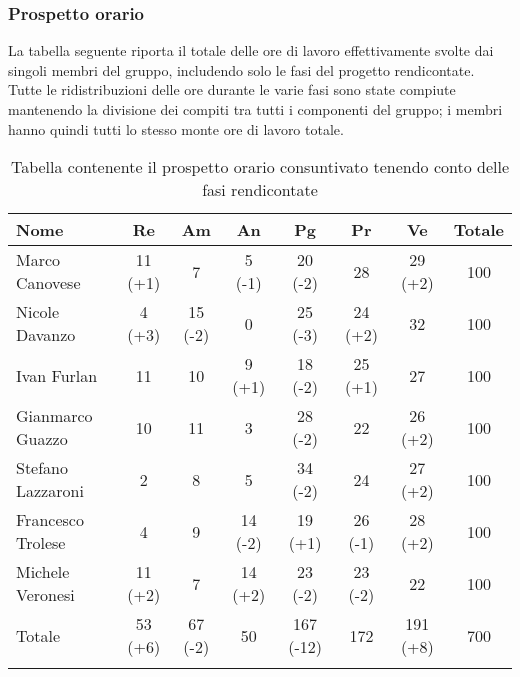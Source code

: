 \subsubsection{Prospetto orario}
La tabella seguente riporta il totale delle ore di lavoro effettivamente svolte dai singoli membri del gruppo, includendo solo le fasi del progetto rendicontate. Tutte le ridistribuzioni delle ore durante le varie fasi sono state compiute mantenendo la divisione dei compiti tra tutti i componenti del gruppo; i membri hanno quindi tutti lo stesso monte ore di lavoro totale.

\begin{longtable}{|p{1.5cm}|c|c|c|c|c|c|c|}
	\hline
	\rowcolor{lighter-grayer}
	\textbf{Nome}     & \textbf{Re} & \textbf{Am} & \textbf{An} & \textbf{Pg} & \textbf{Pr} & \textbf{Ve} & \textbf{Totale} \\
	\hline
	\endfirsthead

	\hline
	Marco Canovese    & 11 (+1)         & 7           & 5 (-1)          & 20 (-2)         & 28          & 29 (+2)         & 100             \\
	\hline
	\hline
	Nicole Davanzo    & 4 (+3)          & 15 (-2)         & 0           & 25 (-3)          & 24 (+2)         & 32          & 100             \\
	\hline
	\hline
	Ivan Furlan       & 11          & 10          & 9 (+1)          & 18 (-2)         & 25 (+1)         & 27          & 100             \\
	\hline
	\hline
	Gianmarco Guazzo  & 10          & 11          & 3           & 28 (-2)         & 22          & 26 (+2)         & 100             \\
	\hline
	\hline
	Stefano Lazzaroni & 2           & 8           & 5           & 34 (-2)         & 24          & 27 (+2)         & 100             \\
	\hline
	\hline
	Francesco Trolese & 4           & 9           & 14 (-2)         & 19 (+1)         & 26 (-1)         & 28 (+2)          & 100             \\
	\hline
	\hline
	Michele Veronesi  & 11 (+2)         & 7           & 14 (+2)         & 23 (-2)         & 23 (-2)          & 22          & 100             \\
	\hline
	\hline
	Totale            & 53 (+6)         & 67 (-2)         & 50          & 167 (-12)        & 172         & 191 (+8)        & 700             \\
	\hline
	\rowcolor{white}
	\caption{Tabella contenente il prospetto orario consuntivato tenendo conto delle fasi rendicontate}
\end{longtable}

